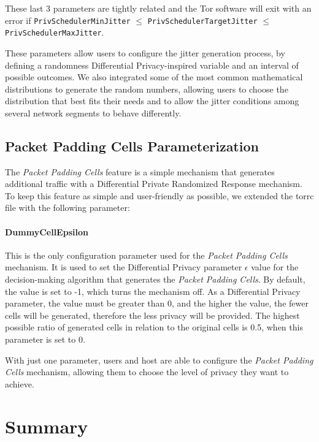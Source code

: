 These last 3 parameters are tightly related and the Tor software will exit with an error if \texttt{PrivSchedulerMinJitter} $\le$ \texttt{PrivSchedulerTargetJitter} $\le$ \texttt{PrivSchedulerMaxJitter}.

These parameters allow users to configure the jitter generation process, by defining a randomness Differential Privacy-inspired variable and an interval of possible outcomes. We also integrated some of the most common mathematical distributions to generate the random numbers, allowing users to choose the distribution that best fits their needs and to allow the jitter conditions among several network segments to behave differently.  
\subsection{Packet Padding Cells Parameterization}\label{sec:packet_padding_parameterization}

The \textit{Packet Padding Cells} feature is a simple mechanism that generates additional traffic with a Differential Private Randomized Response mechanism. To keep this feature as simple and user-friendly as possible, we extended the torrc file with the following parameter:

\paragraph{DummyCellEpsilon} This is the only configuration parameter used for the \textit{Packet Padding Cells} mechanism. It is used to set the Differential Privacy parameter $\epsilon$ value for the decision-making algorithm that generates the \textit{Packet Padding Cells}. By default, the value is set to -1, which turns the mechanism off. As a Differential Privacy parameter, the value must be greater than 0, and the higher the value, the fewer cells will be generated, therefore the less privacy will be provided. The highest possible ratio of generated cells in relation to the original cells is 0.5, when this parameter is set to 0.

With just one parameter, users and host are able to configure the \textit{Packet Padding Cells} mechanism, allowing them to choose the level of privacy they want to achieve. 


\section{Summary}\label{sec:architeture_discussion}

